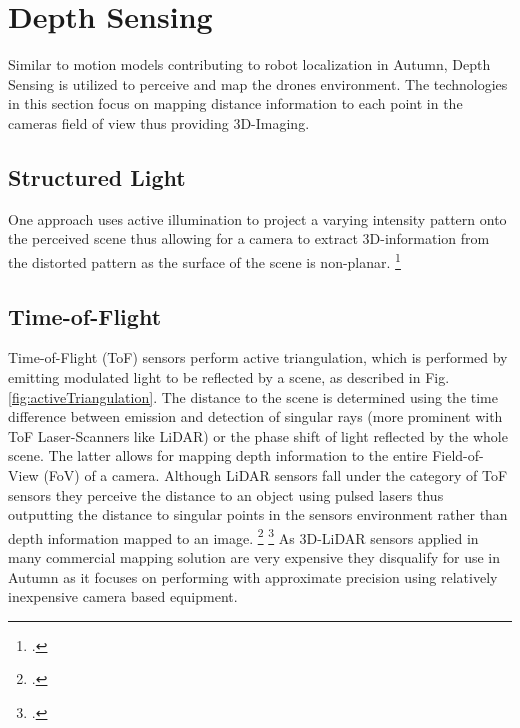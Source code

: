 \section{Depth Sensing}
Similar to motion models contributing to robot localization in Autumn, Depth Sensing is utilized to perceive and map the drones environment. 
The technologies in this section focus on mapping distance information to each point in the cameras field of view thus providing 3D-Imaging.

\subsection{Structured Light}
One approach uses active illumination to project a varying intensity pattern onto the perceived scene thus allowing for a camera to extract 3D-information from the distorted pattern as the surface of the scene is non-planar. \footcite{geng2011StructuredLight}

\subsection{Time-of-Flight}
Time-of-Flight (ToF) sensors perform active triangulation, which is performed by emitting modulated light to be reflected by a scene, as described in Fig. \ref{fig:activeTriangulation}. The distance to the scene is determined using the time difference between emission and detection of singular rays (more prominent with ToF Laser-Scanners like LiDAR) or the phase shift of light reflected by the whole scene. The latter allows for mapping depth information to the entire Field-of-View (FoV) of a camera. 
Although LiDAR sensors fall under the category of ToF sensors they perceive the distance to an object using pulsed lasers thus outputting
the distance to singular points in the sensors environment rather than depth information mapped to an image. \footcite{gokturk2004time} \footcite{velodyne2021LiDAR}
As 3D-LiDAR sensors applied in many commercial mapping solution are very expensive they disqualify for use in Autumn as it focuses on performing with approximate precision using relatively inexpensive camera based equipment. 

